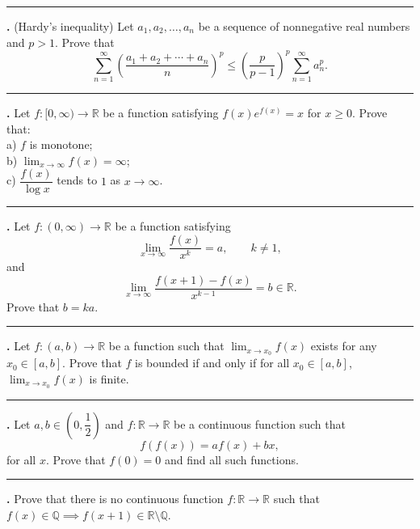 \documentclass[11pt]{article}
\newcounter{probnum}
\newenvironment{problembox}{\par\noindent\rule{\linewidth}{0.5pt}\vspace{5pt}\par}{\vspace{2pt}}
\begin{document}
\begin{problembox}
\textbf{\theprobnum.} (Hardy's inequality) Let $a_1, a_2, \ldots, a_n$ be a sequence of nonnegative real numbers and $p > 1$. Prove that
\[
\sum_{n=1}^{\infty} \left(\frac{a_1+a_2+\cdots+a_n}{n}\right)^p \le \left(\frac{p}{p-1}\right)^p \sum_{n=1}^{\infty} a_n^p.
\]
\end{problembox}

\begin{problembox}
\textbf{\theprobnum.} Let $f : [0,\infty) \to \mathbb{R}$ be a function satisfying $f(x) e^{f(x)} = x$ for $x \ge 0$. Prove that:\\
a) $f$ is monotone;\\
b) $\displaystyle\lim_{x \to \infty} f(x) = \infty$;\\
c) $\dfrac{f(x)}{\log x}$ tends to $1$ as $x \to \infty$.
\end{problembox}

\begin{problembox}
\textbf{\theprobnum.} Let $f : (0,\infty) \to \mathbb{R}$ be a function satisfying
\[
\lim_{x \to \infty} \frac{f(x)}{x^k} = a, \qquad k \ne 1,
\]
and
\[
\lim_{x \to \infty} \frac{f(x+1)-f(x)}{x^{k-1}} = b \in \mathbb{R}.
\]
Prove that $b = ka$.
\end{problembox}

\begin{problembox}
\textbf{\theprobnum.} Let $f : (a,b) \to \mathbb{R}$ be a function such that $\displaystyle\lim_{x \to x_0} f(x)$ exists for any $x_0 \in [a,b]$. Prove that $f$ is bounded if and only if for all $x_0 \in [a,b]$, $\displaystyle\lim_{x \to x_0} f(x)$ is finite.
\end{problembox}

\begin{problembox}
\textbf{\theprobnum.} Let $a, b \in \left(0, \dfrac{1}{2}\right)$ and $f : \mathbb{R} \to \mathbb{R}$ be a continuous function such that
\[
f(f(x)) = a f(x) + bx,
\]
for all $x$. Prove that $f(0) = 0$ and find all such functions.
\end{problembox}

\begin{problembox}
\textbf{\theprobnum.} Prove that there is no continuous function $f : \mathbb{R} \to \mathbb{R}$ such that $f(x) \in \mathbb{Q} \implies f(x+1) \in \mathbb{R} \setminus \mathbb{Q}$.
\end{problembox}
\end{document}
